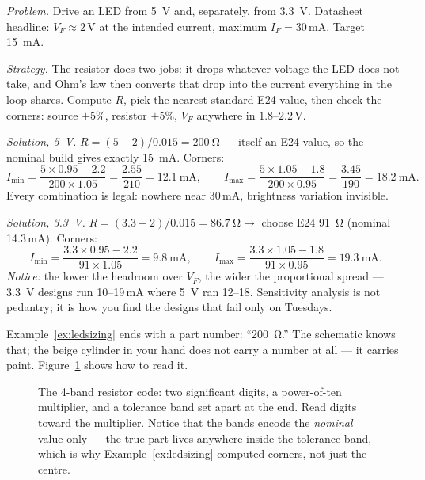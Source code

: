 \begin{example}
\label{ex:ledsizing}
\emph{Problem.} Drive an LED from \qty{5}{\volt} and, separately, from
\qty{3.3}{\volt}. Datasheet headline: $V_F \approx 2$\,V at the intended
current, maximum $I_F = 30$\,mA. Target \qty{15}{\milli\ampere}.\par
\emph{Strategy.} The resistor does two jobs: it drops whatever voltage the
LED does not take, and Ohm's law then converts that drop into the current
everything in the loop shares. Compute $R$, pick the nearest standard E24
value, then check the corners: source $\pm 5\%$, resistor $\pm 5\%$,
$V_F$ anywhere in $1.8$--$2.2$\,V.\par
\emph{Solution, \qty{5}{\volt}.} $R = (5-2)/0.015 = \qty{200}{\ohm}$ — itself
an E24 value, so the nominal build gives exactly \qty{15}{\milli\ampere}.
Corners:
\[
  I_{\min} = \frac{5\times0.95 - 2.2}{200\times1.05}
           = \frac{2.55}{210} = 12.1\ \mathrm{mA},
  \qquad
  I_{\max} = \frac{5\times1.05 - 1.8}{200\times0.95}
           = \frac{3.45}{190} = 18.2\ \mathrm{mA}.
\]
Every combination is legal: nowhere near 30\,mA, brightness variation
invisible.\par
\emph{Solution, \qty{3.3}{\volt}.} $R = (3.3-2)/0.015 = \qty{86.7}{\ohm}
\rightarrow$ choose E24 \qty{91}{\ohm} (nominal 14.3\,mA). Corners:
\[
  I_{\min} = \frac{3.3\times0.95-2.2}{91\times1.05} = 9.8\ \mathrm{mA},
  \qquad
  I_{\max} = \frac{3.3\times1.05-1.8}{91\times0.95} = 19.3\ \mathrm{mA}.
\]
\emph{Notice:} the lower the headroom over $V_F$, the wider the proportional
spread — \qty{3.3}{\volt} designs run 10--19\,mA where \qty{5}{\volt} ran
12--18. Sensitivity analysis is not pedantry; it is how you find the
designs that fail only on Tuesdays.
\end{example}

Example~\ref{ex:ledsizing} ends with a part number: ``\qty{200}{\ohm}.''
The schematic knows that; the beige cylinder in your hand does not carry a
number at all — it carries paint. Figure~\ref{fig:colorcode} shows how to
read it.

\begin{figure}[htbp]
\centering

\caption{The 4-band resistor code: two significant digits, a power-of-ten
multiplier, and a tolerance band set apart at the end. Read digits toward
the multiplier. Notice that the bands encode the \emph{nominal} value only —
the true part lives anywhere inside the tolerance band, which is why
Example~\ref{ex:ledsizing} computed corners, not just the centre.}
\label{fig:colorcode}
\end{figure}

